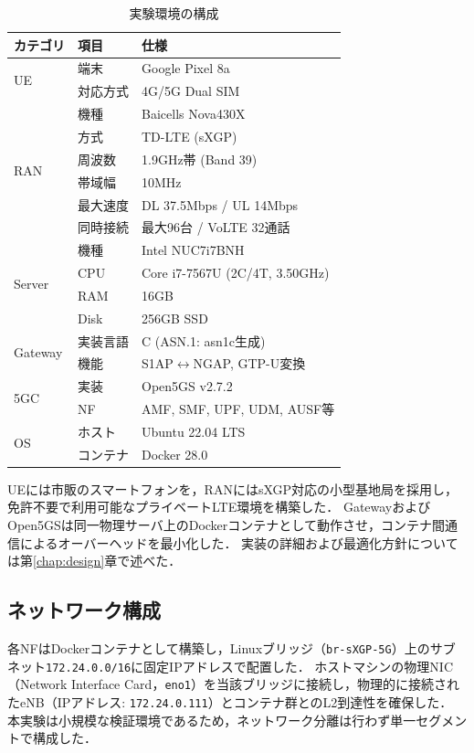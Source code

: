 \begin{table}[htbp]
\centering
\caption{実験環境の構成}
\label{tab:experiment_env}
\small
\begin{tabular}{|l|l|l|}
\hline
\textbf{カテゴリ} & \textbf{項目} & \textbf{仕様} \\
\hline
\hline
\multirow{2}{*}{UE} & 端末 & Google Pixel 8a \\
& 対応方式 & 4G/5G Dual SIM \\
\hline
\multirow{6}{*}{RAN} & 機種 & Baicells Nova430X \\
& 方式 & TD-LTE (sXGP) \\
& 周波数 & 1.9GHz帯 (Band 39) \\
& 帯域幅 & 10MHz \\
& 最大速度 & DL 37.5Mbps / UL 14Mbps \\
& 同時接続 & 最大96台 / VoLTE 32通話 \\
\hline
\multirow{4}{*}{Server} & 機種 & Intel NUC7i7BNH \\
& CPU & Core i7-7567U (2C/4T, 3.50GHz) \\
& RAM & 16GB \\
& Disk & 256GB SSD \\
\hline
\hline
\multirow{2}{*}{Gateway} & 実装言語 & C (ASN.1: asn1c生成) \\
& 機能 & S1AP$\leftrightarrow$NGAP, GTP-U変換 \\
\hline
\multirow{2}{*}{5GC} & 実装 & Open5GS v2.7.2 \\
& NF & AMF, SMF, UPF, UDM, AUSF等 \\
\hline
\multirow{2}{*}{OS} & ホスト & Ubuntu 22.04 LTS \\
& コンテナ & Docker 28.0 \\
\hline
\end{tabular}
\end{table}

UEには市販のスマートフォンを，RANにはsXGP対応の小型基地局を採用し，免許不要で利用可能なプライベートLTE環境を構築した．
GatewayおよびOpen5GSは同一物理サーバ上のDockerコンテナとして動作させ，コンテナ間通信によるオーバーヘッドを最小化した．
実装の詳細および最適化方針については第\ref{chap:design}章で述べた．

\subsection{ネットワーク構成}
各NFはDockerコンテナとして構築し，Linuxブリッジ（\texttt{br-sXGP-5G}）上のサブネット\texttt{172.24.0.0/16}に固定IPアドレスで配置した．
ホストマシンの物理NIC（Network Interface Card，\texttt{eno1}）を当該ブリッジに接続し，物理的に接続されたeNB（IPアドレス: \texttt{172.24.0.111}）とコンテナ群とのL2到達性を確保した．
本実験は小規模な検証環境であるため，ネットワーク分離は行わず単一セグメントで構成した．


